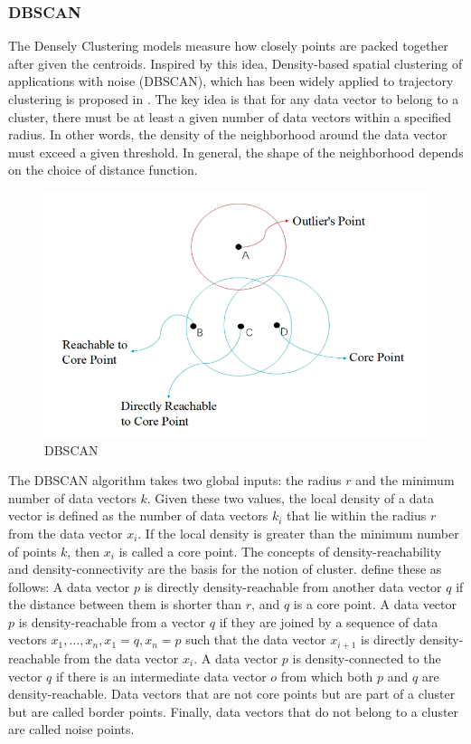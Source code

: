 \documentclass[a4paper, 12pt]{article}
\begin{document}
\subsubsection{DBSCAN}
The Densely Clustering models measure how closely points are packed together after given the centroids. Inspired by this idea, Density-based spatial clustering of applications with noise (DBSCAN), which has been widely applied to trajectory clustering is proposed in \citeyear{ester1996density}. The key idea is that for any data vector to belong to a cluster, there must be at least a given number of data vectors within a specified radius. In other words, the density of the neighborhood around the data vector must exceed a given threshold. In general, the shape of the neighborhood depends on the choice of distance function.

\begin{figure}[ht]
    \centering
    \includegraphics[width=1\textwidth]{DBSCAN.png}
    \caption{DBSCAN \citep{su2020survey}}
\end{figure}

The DBSCAN algorithm \citep{ester1996density, kriegel2011density} takes two global inputs: the radius $r$ and the minimum number of data vectors $k$. Given these two values, the local density of a data vector is defined as the number of data vectors $k_{i}$ that lie within the radius $r$ from the data vector ${x_{i}}$. If the local density is greater than the minimum number of points $k$, then $x_{i}$ is called a core point. The concepts of density-reachability and density-connectivity are the basis for the notion of cluster. \cite{ester1996density} define these as follows: A data vector $p$ is directly density-reachable from another data vector $q$ if the distance between them is shorter than $r$, and $q$ is a core point. A data vector $p$ is density-reachable from a vector $q$ if they are joined by a sequence of data vectors $x_{1},\dots,x_{n}, x_{1}=q, x_{n}=p$ such that the data vector $x_{i+1}$ is directly density-reachable from the data vector $x_{i}$. A data vector $p$ is density-connected to the vector $q$ if there is an intermediate data vector $o$ from which both $p$ and $q$ are density-reachable. Data vectors that are not core points but are part of a cluster but are called border points. Finally, data vectors that do not belong to a cluster are called noise points.
\end{document}
